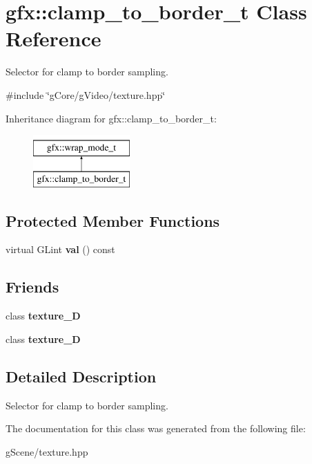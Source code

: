 \hypertarget{classgfx_1_1clamp__to__border__t}{\section{gfx\-:\-:clamp\-\_\-to\-\_\-border\-\_\-t Class Reference}
\label{classgfx_1_1clamp__to__border__t}
}


Selector for clamp to border sampling.  




{\ttfamily \#include \char`\"{}g\-Core/g\-Video/texture.\-hpp\char`\"{}}

Inheritance diagram for gfx\-:\-:clamp\-\_\-to\-\_\-border\-\_\-t\-:\begin{figure}[H]
\begin{center}
\leavevmode
\includegraphics[height=2.000000cm]{classgfx_1_1clamp__to__border__t}
\end{center}
\end{figure}
\subsection*{Protected Member Functions}
\begin{DoxyCompactItemize}
\item 
\hypertarget{classgfx_1_1clamp__to__border__t_a108f12c0c35494ad0407ec46b549ab2c}{virtual G\-Lint {\bfseries val} () const }\label{classgfx_1_1clamp__to__border__t_a108f12c0c35494ad0407ec46b549ab2c}

\end{DoxyCompactItemize}
\subsection*{Friends}
\begin{DoxyCompactItemize}
\item 
\hypertarget{classgfx_1_1clamp__to__border__t_a2039d67f6166ccf823c78e3476aad9aa}{class {\bfseries texture\-\_\-D}}\label{classgfx_1_1clamp__to__border__t_a2039d67f6166ccf823c78e3476aad9aa}

\item 
\hypertarget{classgfx_1_1clamp__to__border__t_a22ad86ef46c3b17357a0cd59e50bc7dd}{class {\bfseries texture\-\_\-D}}\label{classgfx_1_1clamp__to__border__t_a22ad86ef46c3b17357a0cd59e50bc7dd}

\end{DoxyCompactItemize}


\subsection{Detailed Description}
Selector for clamp to border sampling. 

The documentation for this class was generated from the following file\-:\begin{DoxyCompactItemize}
\item 
g\-Scene/texture.\-hpp\end{DoxyCompactItemize}
